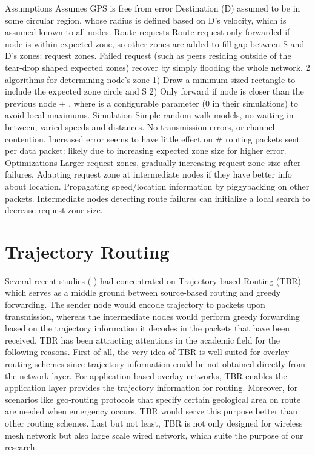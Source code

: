 \documentclass[conference]{IEEEtran}
\begin{document}
\cite{Ko98location-aidedrouting} Assumptions        
Assumes GPS is free from error
Destination (D) assumed to be in some circular region, whose radius is defined based on D's velocity, which is assumed known to all nodes.
Route requests        
Route request  only forwarded if node is within expected zone, so other zones are added to fill gap between S and D's zones: request zones.
Failed request (such as peers residing outside of the tear-drop shaped expected zones) recover by simply flooding the whole network.
2 algorithms for determining node's zone
1) Draw a minimum sized rectangle to include the expected zone circle and S
2) Only forward if node is closer than the previous node + \delta, where \delta is a configurable parameter (0 in their simulations) to avoid local maximums.
Simulation        
Simple random walk models, no waiting in between, varied speeds and distances.
No transmission errors, or channel contention.
Increased error seems to have little effect on # routing packets sent per data packet: likely due to increasing expected zone size for higher error.
Optimizations        
Larger request zones, gradually increasing request zone size after failures.
Adapting request zone at intermediate nodes if they have better info about location.
Propagating speed/location information by piggybacking on other packets.
Intermediate nodes detecting route failures can initialize a local search to decrease request zone size.


\section{Trajectory Routing}

Several recent studies ( \cite{Niculescu2003} \cite{Niculescu2004} \cite{Yuksel2006} ) had concentrated on Trajectory-based Routing (TBR) which serves as a middle ground between source-based routing and greedy forwarding. The sender node would encode trajectory to packets upon transmission, whereas the intermediate nodes would perform greedy forwarding based on the trajectory information it decodes in the 
packets that have been received. TBR has been attracting attentions in the academic field for the following reasons. First of all, the very idea of TBR is well-suited for overlay routing schemes since trajectory information could be not obtained directly from the network layer. For application-based overlay networks, TBR enables
the application layer provides the trajectory information for routing. Moreover, for scenarios like geo-routing protocols that specify certain geological area on route are needed when emergency occurs, TBR would serve this purpose better than other routing schemes. Last but not least, TBR is not only designed for wireless mesh network but also 
large scale wired network, which suite the purpose of our research.
\end{document}
